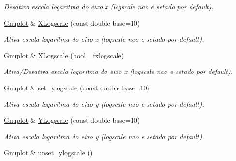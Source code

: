 \begin{DoxyCompactItemize}
\begin{DoxyCompactList}\small\item\em Desativa escala logaritma do eixo x (logscale nao e setado por default). \end{DoxyCompactList}\item 
\hypertarget{classGnuplot_a16763e22005b72ebe62c09653b2dc8fa}{\hyperlink{classGnuplot}{Gnuplot} \& \hyperlink{classGnuplot_a16763e22005b72ebe62c09653b2dc8fa}{X\-Logscale} (const double base=10)}\label{classGnuplot_a16763e22005b72ebe62c09653b2dc8fa}

\begin{DoxyCompactList}\small\item\em Ativa escala logaritma do eixo x (logscale nao e setado por default). \end{DoxyCompactList}\item 
\hypertarget{classGnuplot_abf7948557e91cb8c6eb6b641e1b55543}{\hyperlink{classGnuplot}{Gnuplot} \& \hyperlink{classGnuplot_abf7948557e91cb8c6eb6b641e1b55543}{X\-Logscale} (bool \-\_\-fxlogscale)}\label{classGnuplot_abf7948557e91cb8c6eb6b641e1b55543}

\begin{DoxyCompactList}\small\item\em Ativa/\-Desativa escala logaritma do eixo x (logscale nao e setado por default). \end{DoxyCompactList}\item 
\hypertarget{classGnuplot_a201a802d2f27fece0d39809c4eb3bce0}{\hyperlink{classGnuplot}{Gnuplot} \& \hyperlink{classGnuplot_a201a802d2f27fece0d39809c4eb3bce0}{set\-\_\-ylogscale} (const double base=10)}\label{classGnuplot_a201a802d2f27fece0d39809c4eb3bce0}

\begin{DoxyCompactList}\small\item\em Ativa escala logaritma do eixo y (logscale nao e setado por default). \end{DoxyCompactList}\item 
\hypertarget{classGnuplot_ab9b5e2985c658f7791d9a49dd7008bbf}{\hyperlink{classGnuplot}{Gnuplot} \& \hyperlink{classGnuplot_ab9b5e2985c658f7791d9a49dd7008bbf}{Y\-Logscale} (const double base=10)}\label{classGnuplot_ab9b5e2985c658f7791d9a49dd7008bbf}

\begin{DoxyCompactList}\small\item\em Ativa escala logaritma do eixo y (logscale nao e setado por default). \end{DoxyCompactList}\item 
\hypertarget{classGnuplot_a74ebc96273b30c98fb9c8f047dd34ac0}{\hyperlink{classGnuplot}{Gnuplot} \& \hyperlink{classGnuplot_a74ebc96273b30c98fb9c8f047dd34ac0}{unset\-\_\-ylogscale} ()}\label{classGnuplot_a74ebc96273b30c98fb9c8f047dd34ac0}


\end{DoxyCompactItemize}
